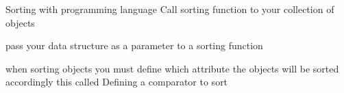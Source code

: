 Sorting with programming language 
  Call sorting function to your collection of objects

  pass your data structure as a parameter to a sorting function

  when sorting objects 
  you must define which attribute the objects will be sorted accordingly
  this called 
    Defining a comparator to sort  